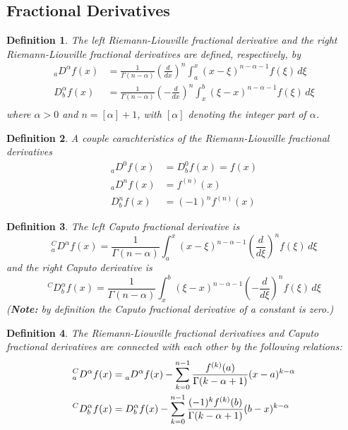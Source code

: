 \documentclass[a4paper,12pt]{extarticle}
\newtheorem{definition}{Definition}[section]
\numberwithin{equation}{subsection}
\begin{document}
\subsection{Fractional Derivatives}
\begin{definition}
The left Riemann-Liouville fractional derivative and the right Riemann-Liouville fractional derivatives are defined, respectively, by
\begin{equation}
\begin{aligned}
_aD^\alpha f(x)&=\frac{1}{\Gamma(n-\alpha)}\left(\frac{d}{dx}\right)^n\int_a^x(x-\xi)^{n-\alpha-1}f(\xi)\,d\xi\\
D_b^\alpha f(x)&=\frac{1}{\Gamma(n-\alpha)}\left(-\frac{d}{dx}\right)^n\int_x^b(\xi-x)^{n-\alpha-1}f(\xi)\,d\xi\\
\end{aligned}
\end{equation}
where $\alpha>0$ and $n=[\alpha]+1$, with $[\alpha]$ denoting the integer part of $\alpha$.
\end{definition}	
\begin{definition}
A couple carachteristics of the  Riemann-Liouville fractional derivatives
\begin{equation}
\begin{aligned}
_aD^0 f(x)&=D_b^0 f(x)=f(x)\\
_aD^n f(x)&=f^{(n)}(x)\\
D_b^n f(x)&=(-1)^nf^{(n)}(x)
\end{aligned}
\end{equation}
\end{definition}	
\begin{definition}
The left Caputo fractional derivative is
\begin{equation}
^C_aD^\alpha f(x)=\frac{1}{\Gamma(n-\alpha)}\int_a^x(x-\xi)^{n-\alpha-1}\left(\frac{d}{d\xi}\right)^nf(\xi)\,d\xi
\end{equation}
and the right Caputo derivative is
\begin{equation}
^CD_b^\alpha f(x)=\frac{1}{\Gamma(n-\alpha)}\int_x^b(\xi-x)^{n-\alpha-1}\left(-\frac{d}{d\xi}\right)^nf(\xi)\,d\xi
\end{equation}
(\textbf{Note:} by definition the Caputo fractional derivative of a constant is zero.)
\end{definition}
\begin{definition}
The Riemann-Liouville fractional derivatives and Caputo fractional derivatives are connected with each other by the following relations:
\begin{equation}
\begin{aligned}
^C_aD^\alpha f(x)&=\prescript{}{a}D^\alpha f(x)-\sum_{k=0}^{n-1}\frac{f^{(k)}(a)}{\Gamma(k-\alpha+1)}(x-a)^{k-\alpha}\\
^CD_b^\alpha f(x)&=D_b^\alpha f(x)-\sum_{k=0}^{n-1}\frac{(-1)^kf^{(k)}(b)}{\Gamma(k-\alpha+1)}(b-x)^{k-\alpha}
\end{aligned}
\end{equation}
\end{definition}
\end{document}
